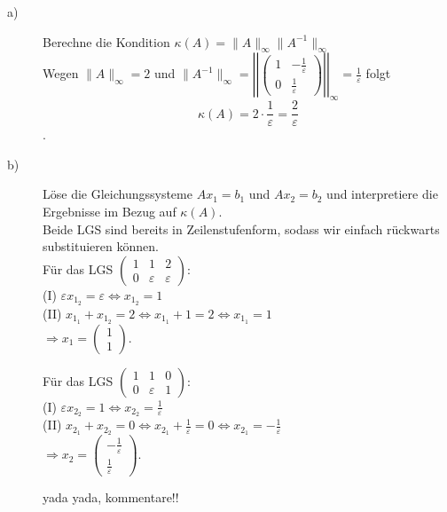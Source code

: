 \documentclass[11pt,a4paper,ngerman]{article}
\begin{document}
\begin{description}
\item[a)] Berechne die Kondition $\kappa(A) = \|A \|_{\infty} \|A^{-1} \|_{\infty} $ \\

Wegen $\|A \|_{\infty} = 2$ und
$\|A^ {-1} \|_{\infty} =
            \left|\left| \left(
                \begin{array}{cc}
                    1 & -\frac{1}{\varepsilon} \\
                    0 & \frac{1}{\varepsilon}
                \end{array}
           \right) \right|\right|_{\infty}
            = \frac{1}{\varepsilon}$
folgt
$$ \kappa(A) = 2 \cdot \frac{1}{\varepsilon} = \frac{2}{\varepsilon}$$.

\item[b)] Löse die Gleichungssysteme $Ax_1 = b_1$ und $Ax_2 = b_2$ und interpretiere die Ergebnisse im Bezug auf $\kappa(A)$. \\

Beide LGS sind bereits in Zeilenstufenform, sodass wir einfach rückwarts substituieren können. \\
Für das LGS $\left(
      \begin{array}{cc|c}
         1 & 1           & 2\\
         0 & \varepsilon & \varepsilon
      \end{array}
    \right)$: \\

(I) $\varepsilon x_{1_2} = \varepsilon \Leftrightarrow x_{1_2} = 1$ \\
(II) $x_{1_1} + x_{1_2} = 2 \Leftrightarrow x_{1_1} + 1 = 2 \Leftrightarrow x_{1_1} = 1$ \\
$ \Rightarrow x_1 = \left(\begin{array}{c} 1 \\ 1 \end{array} \right)$.


Für das LGS $\left(
      \begin{array}{cc|c}
         1 & 1           & 0\\
         0 & \varepsilon & 1
      \end{array}
    \right)$: \\

(I) $\varepsilon x_{2_2} = 1 \Leftrightarrow x_{2_2} = \frac{1}{\varepsilon}$ \\
(II) $x_{2_1} + x_{2_2} = 0 \Leftrightarrow x_{2_1} + \frac{1}{\varepsilon} = 0 \Leftrightarrow x_{2_1} = -\frac{1}{\varepsilon}$ \\
$ \Rightarrow x_2 = \left(\begin{array}{c} -\frac{1}{\varepsilon} \\ \frac{1}{\varepsilon} \end{array} \right)$.

yada yada, kommentare!!
\end{description}
\end{document}

